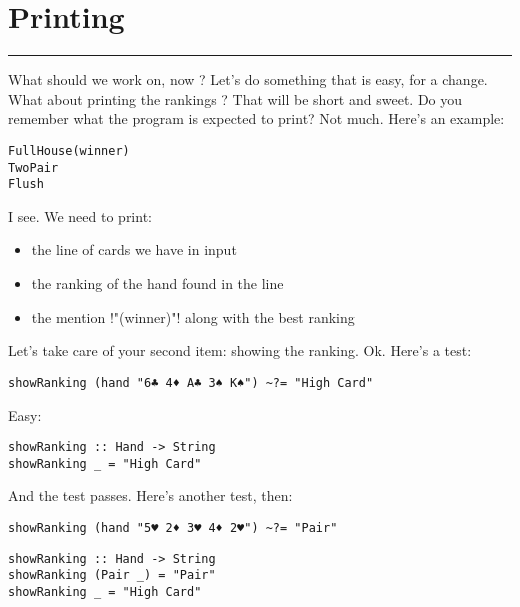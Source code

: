 \newpage
\section{Printing} 
\vspace{10cm}
\hrule

\lhQ What should we work on, now ?
\lhA Let's do something that is easy, for a change.
\lhN What about printing the rankings ?
\lhA That will be short and sweet.
\lhN Do you remember what the program is expected to print?
\lhA Not much.
\lhN Here's an example:
\begin{alltt}
       Full House (winner)
       Two Pair
      
  
       Flush
     
\end{alltt}
\lhA I see. We need to print:
\begin{itemize}
\item the line of cards we have in input
\item the ranking of the hand found in the line
\item the mention \il!"(winner)"! along with the best ranking
\end{itemize}
\hspace*{\fill}\vspace*{\fill}
\lhN Let's take care of your second item: showing the ranking.
\lhA Ok.
\lhN  Here's a test:
\begin{lstlisting}[frame=single]
showRanking (hand "6♣ 4♦ A♣ 3♠ K♠") ~?= "High Card"
\end{lstlisting}
\lhA Easy:
\begin{lstlisting}[frame=single]
showRanking :: Hand -> String
showRanking _ = "High Card"
\end{lstlisting}
\success And the test passes.
\lhN Here's another test, then:
\begin{lstlisting}[frame=single]
showRanking (hand "5♥ 2♦ 3♥ 4♦ 2♥") ~?= "Pair"
\end{lstlisting}
\lhA 
\begin{lstlisting}[frame=single]
showRanking :: Hand -> String
showRanking (Pair _) = "Pair"
showRanking _ = "High Card"
\end{lstlisting}

